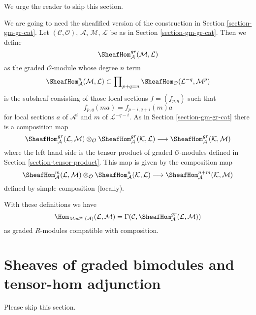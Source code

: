 \noindent
We urge the reader to skip this section.

\medskip\noindent
We are going to need the sheafified version of the construction
in Section \ref{section-gm-gr-cat}.
Let $(\mathcal{C}, \mathcal{O})$, $\mathcal{A}$,
$\mathcal{M}$, $\mathcal{L}$ be as in Section \ref{section-gm-gr-cat}.
Then we define
$$
\SheafHom^{gr}_\mathcal{A}(\mathcal{M}, \mathcal{L})
$$
as the graded $\mathcal{O}$-module whose degree $n$ term
$$
\SheafHom^n_\mathcal{A}(\mathcal{M}, \mathcal{L})
\subset
\prod\nolimits_{p + q = n}
\SheafHom_\mathcal{O}(\mathcal{L}^{-q}, \mathcal{M}^p)
$$
is the subsheaf consisting of those local sections $f = (f_{p, q})$ such that
$$
f_{p, q}(m a) = f_{p - i, q + i}(m)a
$$
for local sections $a$ of $\mathcal{A}^i$ and
$m$ of $\mathcal{L}^{-q - i}$. As in Section \ref{section-gm-gr-cat}
there is a composition map
$$
\SheafHom^{gr}_\mathcal{A}(\mathcal{L}, \mathcal{M}) \otimes_\mathcal{O}
\SheafHom^{gr}_\mathcal{A}(\mathcal{K}, \mathcal{L})
\longrightarrow
\SheafHom^{gr}_\mathcal{A}(\mathcal{K}, \mathcal{M})
$$
where the left hand side is the tensor product of graded $\mathcal{O}$-modules
defined in Section \ref{section-tensor-product}.
This map is given by the composition map
$$
\SheafHom^m_\mathcal{A}(\mathcal{L}, \mathcal{M}) \otimes_\mathcal{O}
\SheafHom^n_\mathcal{A}(\mathcal{K}, \mathcal{L}) \longrightarrow
\SheafHom^{n + m}_\mathcal{A}(\mathcal{K}, \mathcal{M})
$$
defined by simple composition (locally).

\medskip\noindent
With these definitions we have
$$
\Hom_{\textit{Mod}^{gr}(\mathcal{A})}(\mathcal{L}, \mathcal{M}) =
\Gamma(\mathcal{C}, \SheafHom^{gr}_\mathcal{A}(\mathcal{L}, \mathcal{M}))
$$
as graded $R$-modules compatible with composition.







\section{Sheaves of graded bimodules and tensor-hom adjunction}
\label{section-graded-bimodules}

\noindent
Please skip this section.

